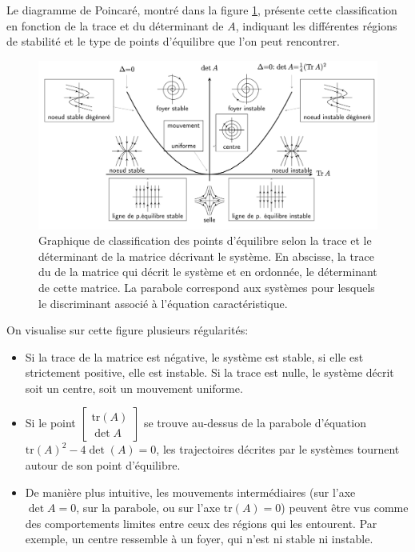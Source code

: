             Le diagramme de Poincaré, montré dans la figure \ref{fig:poincare}, présente cette classification en fonction de la trace et du déterminant de $A$, indiquant les différentes régions de stabilité et le type de points d'équilibre que l'on peut rencontrer.
            \begin{figure}[ht!]
                \centering
                \includegraphics[width=\textwidth]{images/poincare.png}
                \caption{Graphique de classification des points d'équilibre selon la trace et le déterminant de la matrice décrivant le système. En abscisse, la trace du de la matrice qui décrit le système et en ordonnée, le déterminant de cette matrice. La parabole correspond aux systèmes pour lesquels le discriminant associé à l'équation caractéristique.}
                \label{fig:poincare}
            \end{figure}

            On visualise sur cette figure plusieurs régularités:
            \begin{itemize}
                \item Si la trace de la matrice est négative, le système est stable, si elle est strictement positive, elle est instable. Si la trace est nulle, le système décrit soit un centre, soit un mouvement uniforme.
                \item Si le point $\begin{bmatrix}\text{tr}(A)\\\det A\end{bmatrix}$ se trouve au-dessus de la parabole d'équation $\text{tr}(A)^2 - 4 \det(A) = 0$, les trajectoires décrites par le systèmes tournent autour de son point d'équilibre.
                \item De manière plus intuitive, les mouvements intermédiaires (sur l'axe $\det A = 0$,  sur la parabole, ou sur l'axe $\text{tr}(A) = 0$) peuvent être vus comme des comportements limites entre ceux des régions qui les entourent. Par exemple, un centre ressemble à un foyer, qui n'est ni stable ni instable.
            \end{itemize}
            
